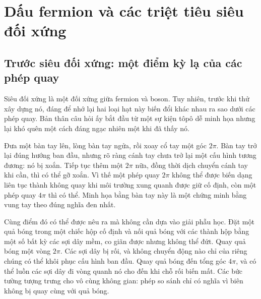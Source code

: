 \chapter{Dấu fermion và các triệt tiêu siêu đối xứng}


\section{Trước siêu đối xứng: một điểm kỳ lạ của các phép quay}

Siêu đối xứng là một đối xứng giữa fermion và boson. Tuy nhiên, trước khi thử xây dựng nó, đáng để nhớ lại hai loại hạt này biến đổi khác nhau ra sao dưới các phép quay. Bản thân câu hỏi ấy bắt đầu từ một sự kiện tôpô dễ minh họa nhưng lại khó quên một cách đáng ngạc nhiên một khi đã thấy nó.

Đưa một bàn tay lên, lòng bàn tay ngửa, rồi xoay cổ tay một góc \(2\pi\). Bàn tay trở lại đúng hướng ban đầu, nhưng rõ ràng cánh tay chưa trở lại một cấu hình tương đương: nó bị xoắn. Tiếp tục thêm một \(2\pi\) nữa, đồng thời dịch chuyển cánh tay khi cần, thì có thể gỡ xoắn. Vì thế một phép quay \(2\pi\) không thể được biến dạng liên tục thành không quay khi môi trường xung quanh được giữ cố định, còn một phép quay \(4\pi\) thì có thể. Minh họa bằng bàn tay này là một chứng minh bằng vung tay theo đúng nghĩa đen nhất.

Cùng điểm đó có thể được nêu ra mà không cần dựa vào giải phẫu học. Đặt một quả bóng trong một chiếc hộp cố định và nối quả bóng với các thành hộp bằng một số bất kỳ các sợi dây mềm, co giãn được nhưng không thể đứt. Quay quả bóng một vòng \(2\pi\). Các sợi dây bị rối, và không chuyển động nào chỉ của riêng chúng có thể khôi phục cấu hình ban đầu. Quay quả bóng đến tổng góc \(4\pi\), và có thể luồn các sợi dây đi vòng quanh nó cho đến khi chỗ rối biến mất. Các bức tường tượng trưng cho vô cùng không gian: phép so sánh chỉ có nghĩa vì biên không bị quay cùng với quả bóng.

